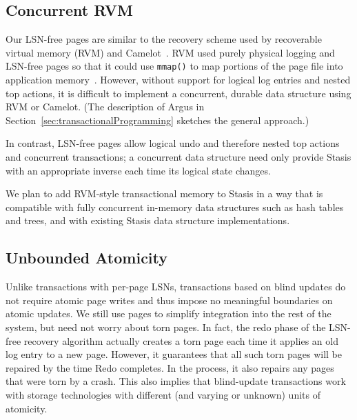 \documentclass[letterpaper,twocolumn,10pt]{article}
\newcommand{\yad}{Stasis\xspace}
\begin{document}
\subsection{Concurrent RVM}

Our LSN-free pages are similar to the recovery scheme used by
recoverable virtual memory (RVM) and Camelot~\cite{camelot}. RVM
used purely physical logging and LSN-free pages so that it
could use {\tt mmap()} to map portions of the page file into application
memory~\cite{lrvm}.  However, without support for logical log entries
and nested top actions, it is difficult to implement a
concurrent, durable data structure using RVM or Camelot.  (The description of
Argus in Section~\ref{sec:transactionalProgramming} sketches the
general approach.)  

In contrast, LSN-free pages allow logical
undo and therefore nested top actions and concurrent
transactions; a concurrent data structure need only provide \yad
with an appropriate inverse each time its logical state changes.

We plan to add RVM-style transactional memory to \yad in a way that is
compatible with fully concurrent in-memory data structures such as
hash tables and trees, and with existing
\yad data structure implementations.


\subsection{Unbounded Atomicity}
\label{sec:torn-page}


Unlike transactions with per-page LSNs, transactions based on blind 
updates do not require atomic page writes
and thus impose no meaningful boundaries on atomic updates.  We still
use pages to simplify integration into the rest of the system, but
need not worry about torn pages.  In fact, the redo phase of the
LSN-free recovery algorithm actually creates a torn page each time it
applies an old log entry to a new page.  However, it guarantees that
all such torn pages will be repaired by the time Redo completes.  In
the process, it also repairs any pages that were torn by a crash.
This also implies that blind-update transactions work with storage technologies with
different (and varying or unknown) units of atomicity.
\end{document}

